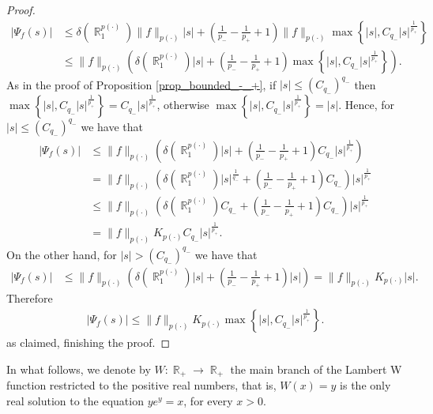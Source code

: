 \documentclass[11pt,reqno]{amsart}
\theoremstyle{definition}
\theoremstyle{definition}
\theoremstyle{definition}
\DeclareMathOperator{\R}{\mathbb{R}}
\newcommand{\p}{p(\cdot)}
\begin{document}
\begin{proof}
   \begin{align*}
       |\Psi_f(s)|&\leq \delta\left(\R_1^{\p}\right)\|f\|_{\p}|s|+\left(\frac{1}{p_{-}}-\frac{1}{p_{+}}+1\right)\|f\|_{p(\cdot)}\max\left\{|s|,C_{q_{-}}|s|^{\frac{1}{p_{+}}}\right\}\\
       &\leq \|f\|_{\p}\left(\delta\left(\R_1^{\p}\right)|s|+\left(\frac{1}{p_{-}}-\frac{1}{p_{+}}+1\right)\max\left\{|s|,C_{q_{-}}|s|^{\frac{1}{p_{+}}}\right\}\right).
   \end{align*}
   As in the proof of Proposition \ref{prop_bounded_-_+}, if $|s|\leq (C_{q_{-}})^{q_{-}}$ then $\max\left\{|s|,C_{q_{-}}|s|^{\frac{1}{p_{+}}}\right\}=C_{q_{-}}|s|^{\frac{1}{p_{+}}}$, otherwise
    $\max\left\{|s|,C_{q_{-}}|s|^{\frac{1}{p_{+}}}\right\}=|s|$. Hence, for $|s|\leq (C_{q_{-}})^{q_{-}}$
 we have that
 \begin{align*}
     |\Psi_f(s)| &\leq \|f\|_{\p}\left(\delta\left(\R_1^{\p}\right)|s|+\left(\frac{1}{p_{-}}-\frac{1}{p_{+}}+1\right)C_{q_{-}}|s|^{\frac{1}{p_{+}}}\right)\\
     &= \|f\|_{\p}\left(\delta\left(\R_1^{\p}\right)|s|^{\frac{1}{q_{-}}}+\left(\frac{1}{p_{-}}-\frac{1}{p_{+}}+1\right)C_{q_{-}}\right)|s|^{\frac{1}{p_{+}}}\\
     &\leq \|f\|_{\p}\left(\delta\left(\R_1^{\p}\right)C_{q_{-}}+\left(\frac{1}{p_{-}}-\frac{1}{p_{+}}+1\right)C_{q_{-}}\right)|s|^{\frac{1}{p_{+}}}\\
     &=\|f\|_{\p}K_{\p}C_{q_{-}}|s|^{\frac{1}{p_{+}}}.
 \end{align*}
 On the other hand, for $|s|>(C_{q_{-}})^{q_{-}}$ we have that
 \begin{align*}
      |\Psi_f(s)|&\leq \|f\|_{\p}\left(\delta\left(\R_1^{\p}\right)|s|+\left(\frac{1}{p_{-}}-\frac{1}{p_{+}}+1\right)|s|\right)= \|f\|_{\p}K_{\p}|s|.
 \end{align*}
 Therefore
 \begin{align*}
       |\Psi_f(s)|\leq\|f\|_{\p}K_{\p}\max\left\{|s|,C_{q_{-}}|s|^{\frac{1}{p_{+}}}\right\}.
   \end{align*}
   as claimed, finishing the proof.
\end{proof}












In what follows, we denote by $W:\R_+\to \R_+$ the main branch of the Lambert W function restricted to the positive real numbers, that is, $W(x)=y$ is the only real solution to the equation $ye^{y}=x$, for every $x>0$.
\end{document}
